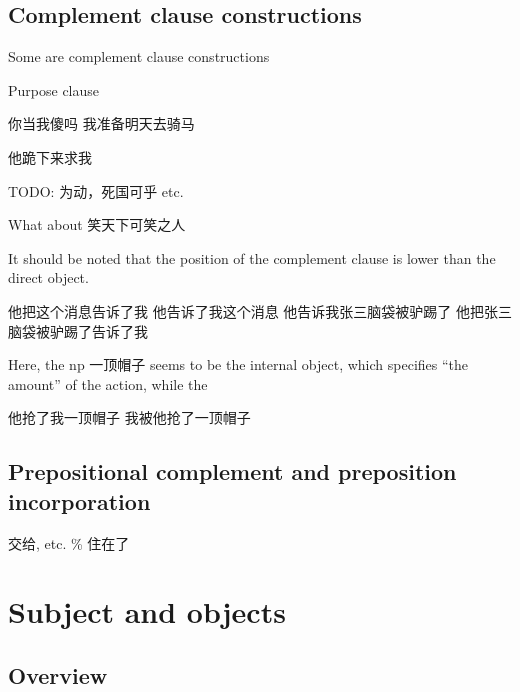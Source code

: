 \documentclass[UTF8, a4paper, oneside, scheme=plain, 12pt]{ctexrep}
\begin{document}
\subsection{Complement clause constructions}

Some are complement clause constructions

Purpose clause

\begin{exe}
    \ex 你当我傻吗
    \ex 我准备明天去骑马
\end{exe}

\begin{exe}
    \ex 他跪下来求我
\end{exe}

TODO: 为动，死国可乎 etc.

What about 笑天下可笑之人

It should be noted that the position of the complement clause
is lower than the direct object.

\begin{exe}
    \ex 他把这个消息告诉了我
    \ex 他告诉了我这个消息
    \ex 他告诉我张三脑袋被驴踢了
    \ex *他把张三脑袋被驴踢了告诉了我
\end{exe}

Here, the \acs{np} 一顶帽子 seems to be the internal object, 
which specifies ``the amount'' of the action,
while the 

\begin{exe}
    \ex 他抢了我一顶帽子
    \ex 我被他抢了一顶帽子
\end{exe}

\subsection{Prepositional complement and preposition incorporation}\label{sec:verb-phrase.internal.preposition}

交给, etc. \% 住在了

\section{Subject and objects}

\subsection{Overview}
\end{document}
